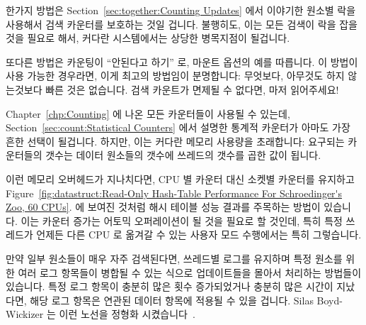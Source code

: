한가지 방법은
Section~\ref{sec:together:Counting Updates}
에서 이야기한 원소별 락을 사용해서 검색 카운터를 보호하는 것일 겁니다.
불행히도, 이는 모든 검색이 락을 잡을 것을 필요로 해서, 커다란 시스템에서는
상당한 병목지점이 될겁니다.

또다른 방법은 카운팅이 ``안된다고 하기'' 로,  마운트 옵션의 예를
따릅니다.
이 방법이 사용 가능한 경우라면, 이게 최고의 방법임이 분명합니다: 무엇보다,
아무것도 하지 않는것보다 빠른 것은 없습니다.
검색 카운트가 면제될 수 없다면, 마저 읽어주세요!
\iffalse

Suppose that Schr\"odinger also wants to count the number of lookups for
each animal, where lookups are protected by RCU.
How can this counting best be done?

One approach would be to protect a lookup counter with the per-element
lock, as discussed in
Section~\ref{sec:together:Counting Updates}.
Unfortunately, this would require all lookups to acquire this lock,
which would be a severe bottleneck on large systems.

Another approach is to ``just say no'' to counting, following the example
of the \co{noatime} mount option.
If this approach is feasible, it is clearly the best:  After all, nothing
is faster than doing nothing.
If the lookup count cannot be dispensed with, read on!
\fi

Chapter~\ref{chp:Counting} 에 나온 모든 카운터들이 사용될 수 있는데,
Section~\ref{sec:count:Statistical Counters}
에서 설명한 통계적 카운터가 아마도 가장 흔한 선택이 될겁니다.
하지만, 이는 커다란 메모리 사용량을 초래합니다: 요구되는 카운터들의 갯수는
데이터 원소들의 갯수에 쓰레드의 갯수를 곱한 값이 됩니다.

이런 메모리 오버헤드가 지나치다면, CPU 별 카운터 대신 소켓별 카운터를 유지하고
Figure~\ref{fig:datastruct:Read-Only Hash-Table Performance For Schroedinger's Zoo, 60 CPUs}.
에 보여진 것처럼 해시 테이블 성능 결과를 주목하는 방법이 있습니다.
이는 카운터 증가는 어토믹 오퍼레이션이 될 것을 필요로 할 것인데, 특히 특정
쓰레드가 언제든 다른 CPU 로 옮겨갈 수 있는 사용자 모드 수행에서는 특히
그렇습니다.

만약 일부 원소들이 매우 자주 검색된다면, 쓰레드별 로그를 유지하며 특정 원소를
위한 여러 로그 항목들이 병합될 수 있는 식으로 업데이트들을 몰아서 처리하는
방법들이 있습니다.
특정 로그 항목이 충분히 많은 횟수 증가되었거나 충분히 많은 시간이 지났다면,
해당 로그 항목은 연관된 데이터 항목에 적용될 수 있을 겁니다.
Silas Boyd-Wickizer 는 이런 노선을 정형화
시켰습니다~\cite{SilasBoydWickizerPhD}.
\iffalse

